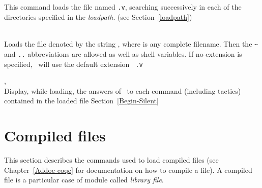 \subsection[\tt Load {\ident}.]{}
This command loads the file named {\ident}{\tt .v}, searching
successively in each of the directories specified in the {\em
  loadpath}. (see Section~\ref{loadpath})

\begin{Variants}
\item {}\label{Load-str}\\
  Loads the file denoted by the string {\str}, where {\str} is any
  complete filename. Then the \verb.~. and {\tt ..}
  abbreviations are allowed as well as shell variables. If no
  extension is specified, \Coq\ will use the default extension {\tt
    .v}
\item {},
  {}\\
  Display, while loading, the answers of \Coq\ to each command
  (including tactics) contained in the loaded file
  \SeeAlso Section~\ref{Begin-Silent}
\end{Variants}

\begin{ErrMsgs}
\item {}
\end{ErrMsgs}

\section[Compiled files]{Compiled files\label{compiled}}

This section describes the commands used to load compiled files (see
Chapter~\ref{Addoc-coqc} for documentation on how to compile a file).
A compiled file is a particular case of module called {\em library file}.


\subsection[\tt Require {\qualid}.]{}


